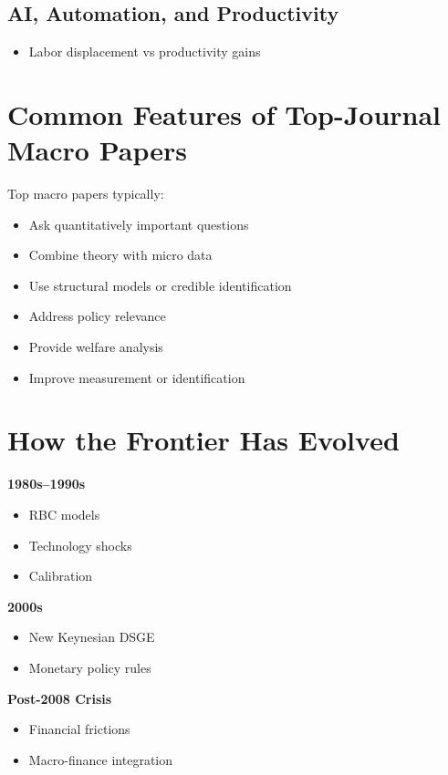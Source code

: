 \documentclass[12pt]{article}
\begin{document}
\subsection*{AI, Automation, and Productivity}
\begin{itemize}
\item Labor displacement vs productivity gains
\end{itemize}

\section{Common Features of Top-Journal Macro Papers}

Top macro papers typically:

\begin{itemize}
\item Ask quantitatively important questions
\item Combine theory with micro data
\item Use structural models or credible identification
\item Address policy relevance
\item Provide welfare analysis
\item Improve measurement or identification
\end{itemize}

\section{How the Frontier Has Evolved}

\textbf{1980s--1990s}
\begin{itemize}
\item RBC models
\item Technology shocks
\item Calibration
\end{itemize}

\textbf{2000s}
\begin{itemize}
\item New Keynesian DSGE
\item Monetary policy rules
\end{itemize}

\textbf{Post-2008 Crisis}
\begin{itemize}
\item Financial frictions
\item Macro-finance integration
\end{itemize}
\end{document}
